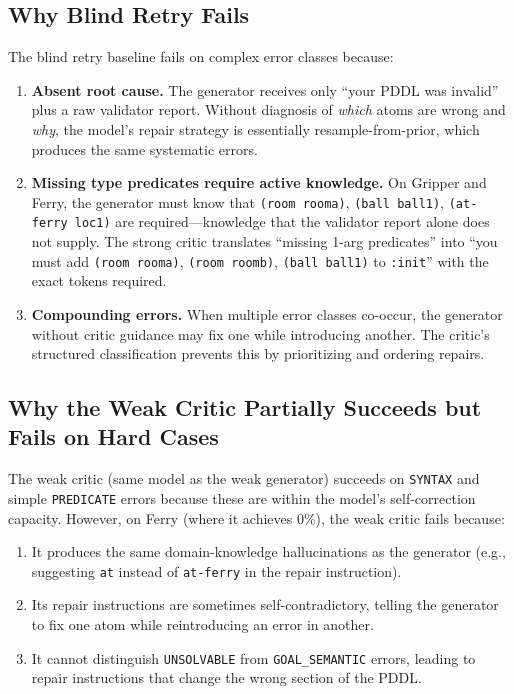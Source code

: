 \documentclass{article}
\begin{document}
\subsection{Why Blind Retry Fails}
\label{sec:blind_failure}

The blind retry baseline fails on complex error classes because:

\begin{enumerate}[leftmargin=1.5em]
  \item \textbf{Absent root cause.}
        The generator receives only ``your PDDL was invalid'' plus a raw validator
        report.  Without diagnosis of \emph{which} atoms are wrong and \emph{why},
        the model's repair strategy is essentially resample-from-prior, which
        produces the same systematic errors.

  \item \textbf{Missing type predicates require active knowledge.}
        On Gripper and Ferry, the generator must know that \texttt{(room rooma)},
        \texttt{(ball ball1)}, \texttt{(at-ferry loc1)} are required---knowledge
        that the validator report alone does not supply.  The strong critic translates
        ``missing 1-arg predicates'' into ``you must add \texttt{(room rooma)},
        \texttt{(room roomb)}, \texttt{(ball ball1)} to \texttt{:init}'' with the
        exact tokens required.

  \item \textbf{Compounding errors.}
        When multiple error classes co-occur, the generator without critic guidance
        may fix one while introducing another.  The critic's structured classification
        prevents this by prioritizing and ordering repairs.
\end{enumerate}

\subsection{Why the Weak Critic Partially Succeeds but Fails on Hard Cases}
\label{sec:weak_critic_analysis}

The weak critic (same model as the weak generator) succeeds on \texttt{SYNTAX} and
simple \texttt{PREDICATE} errors because these are within the model's self-correction
capacity.  However, on Ferry (where it achieves 0\%), the weak critic fails because:

\begin{enumerate}[leftmargin=1.5em]
  \item It produces the same domain-knowledge hallucinations as the generator (e.g.,
        suggesting \texttt{at} instead of \texttt{at-ferry} in the repair instruction).
  \item Its repair instructions are sometimes self-contradictory, telling the generator
        to fix one atom while reintroducing an error in another.
  \item It cannot distinguish \texttt{UNSOLVABLE} from \texttt{GOAL\_SEMANTIC} errors,
        leading to repair instructions that change the wrong section of the PDDL.
\end{enumerate}
\end{document}
